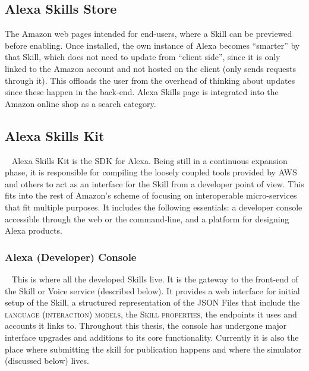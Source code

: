 	
	\subsection*{Alexa Skills Store} %
	The Amazon web pages intended for end-users, where a %
	Skill can be previewed before enabling. %
	Once installed, the own instance of Alexa becomes ``smarter'' by that Skill, which does not need to update from ``client side'', since it is only linked to the Amazon account and not hosted on the client (only sends requests through it).  %
	This offloads the user from the overhead of %
	thinking about updates since these happen in the back-end. Alexa Skills page is integrated into the Amazon online shop as a search category.
	
	
	\subsection*{Alexa Skills Kit}~\label{ask:def} %
	Alexa Skills Kit is the SDK for Alexa.
	Being still in a continuous expansion phase, it is responsible for compiling the loosely coupled tools provided by AWS and others to act as an interface for the Skill from a developer point of view. This fits into the rest of Amazon's scheme of focusing on interoperable micro-services that fit multiple purposes. It includes the following essentials: a developer console accessible through the web or the command-line, and a platform for designing Alexa products.
	
	
		\subsubsection*{Alexa (Developer) Console}~\label{ask:devconsole} This is where all the developed Skills live. It is the gateway to the front-end of the Skill or Voice service (described below). It provides a web interface for initial setup of the Skill, a structured representation of the JSON Files that include the \textsc{language (interaction) models}, the \textsc{Skill properties}, the endpoints it uses and accounts it links to. 
		Throughout this thesis, the console has undergone major interface upgrades and additions to its core functionality. Currently it is also the place where submitting the skill for publication happens and where the simulator (discussed below) lives.
		
